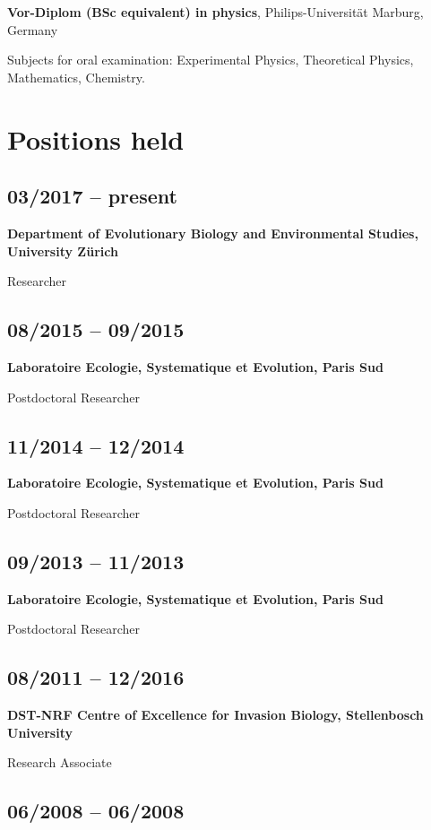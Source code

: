 \documentclass[a4paper]{article}
\begin{document}
\textbf{Vor-Diplom (BSc equivalent) in physics}, Philips-Universität Marburg, Germany

Subjects for oral examination: Experimental Physics, Theoretical Physics, Mathematics, Chemistry.

\section{Positions held}

\subsection{03/2017 -- present}

\textbf{Department of Evolutionary Biology and Environmental Studies, University Zürich}

Researcher

\subsection{08/2015 -- 09/2015}

\textbf{Laboratoire Ecologie, Systematique et Evolution, Paris Sud} 

Postdoctoral Researcher

\subsection{11/2014 -- 12/2014}

\textbf{Laboratoire Ecologie, Systematique et Evolution, Paris Sud} 

Postdoctoral Researcher

\subsection{09/2013 -- 11/2013}

\textbf{Laboratoire Ecologie, Systematique et Evolution, Paris Sud}

Postdoctoral Researcher

\subsection{08/2011 -- 12/2016}

\textbf{DST-NRF Centre of Excellence for Invasion Biology, Stellenbosch University}

Research Associate

\subsection{06/2008 -- 06/2008}
\end{document}
